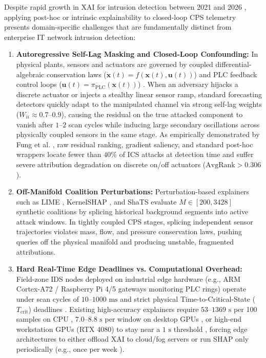 \documentclass[10pt,a4paper]{article}
\begin{document}
Despite rapid growth in XAI for intrusion detection between 2021 and 2026 \cite{neupane2022survey, arreche2024exai, wei2023xnids}, applying post-hoc or intrinsic explainability to closed-loop CPS telemetry presents domain-specific challenges that are fundamentally distinct from enterprise IT network intrusion detection:
\begin{enumerate}\setlength{\itemsep}{2pt}\setlength{\parskip}{0pt}
    \item \textbf{Autoregressive Self-Lag Masking and Closed-Loop Confounding:} In physical plants, sensors and actuators are governed by coupled differential-algebraic conservation laws ($\dot{\mathbf{x}}(t) = f(\mathbf{x}(t), \mathbf{u}(t))$) and PLC feedback control loops ($\mathbf{u}(t) = \pi_{\text{PLC}}(\mathbf{x}(t))$) \cite{fung2024ndss, kenmogne2024netsoft}. When an adversary hijacks a discrete actuator or injects a stealthy linear sensor ramp, standard forecasting detectors quickly adapt to the manipulated channel via strong self-lag weights ($W_{ii} \approx 0.7\text{--}0.9$), causing the residual on the true attacked component to vanish after $1\text{--}2$ scan cycles while inducing large secondary oscillations across physically coupled sensors in the same stage. As empirically demonstrated by Fung et al. \cite{fung2024ndss}, raw residual ranking, gradient saliency, and standard post-hoc wrappers locate fewer than $40\%$ of ICS attacks at detection time and suffer severe attribution degradation on discrete on/off actuators ($\text{AvgRank} > 0.306$).
    \item \textbf{Off-Manifold Coalition Perturbations:} Perturbation-based explainers such as LIME \cite{mathuros2024waxai}, KernelSHAP \cite{huong2022fedex, yazdinejad2025tcss}, and ShaTS \cite{franco2026shats} evaluate $M \in [200, 3428]$ synthetic coalitions by splicing historical background segments into active attack windows. In tightly coupled CPS stages, splicing independent sensor trajectories violates mass, flow, and pressure conservation laws, pushing queries off the physical manifold and producing unstable, fragmented attributions.
    \item \textbf{Hard Real-Time Edge Deadlines vs. Computational Overhead:} Field-zone IDS nodes deployed on industrial edge hardware (e.g., ARM Cortex-A72 / Raspberry Pi 4/5 gateways monitoring PLC rings) operate under scan cycles of $10\text{--}1000\text{ ms}$ and strict physical Time-to-Critical-State ($T_{\text{crit}}$) deadlines \cite{huong2022fedex, ericson2025wfcs, alrawajbeh2025mdpi}. Existing high-accuracy explainers require $53\text{--}1369\text{ s}$ per 100 samples on CPU \cite{mathuros2024waxai}, $7.0\text{--}8.8\text{ s}$ per window on desktop GPUs \cite{oinonen2026epsr}, or high-end workstation GPUs (RTX 4080) to stay near a $1\text{ s}$ threshold \cite{franco2026shats}, forcing edge architectures to either offload XAI to cloud/fog servers \cite{ericson2025wfcs} or run SHAP only periodically (e.g., once per week \cite{huong2022fedex}).

\end{enumerate}
\end{document}
